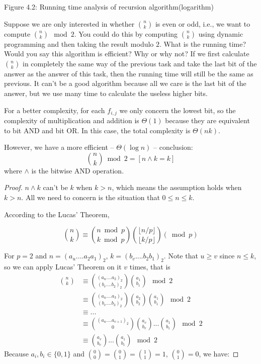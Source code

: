 \documentclass[11pt,a4paper,oneside]{article}
\begin{document}
\begin{problem}{4}
\begin{center}
	Figure 4.2: Running time analysis of recursion algorithm(logarithm)
	\end{center}
\end{problem}

\begin{problem}{5}
    \statement
    Suppose we are only interested in whether ${n \choose k}$ is even or odd,
  i.e., we want to compute ${n \choose k}  \mod 2$. You could do this by computing 
  ${n \choose k}$ using dynamic programming and then taking
  the result modulo $2$. What is the running time? Would you say this algorithm
  is efficient? Why or why not?
  \solution
If we first calculate ${n \choose k}$ in completely the same way of the previous task and take the last bit of the answer as the answer of this task, then the running time will still be the same as previous. It can't be a good algorithm because all we care is the last bit of the answer, but we use many time to calculate the useless higher bits.

For a better complexity, for each $f_{i, j}$ we only concern the lowest bit, so the complexity of multiplication and addition is $\Theta(1)$ because they are equivalent to bit AND and bit OR. In this case, the total complexity is $\Theta(nk)$.

However, we have a more efficient  -- $\Theta (\log n)$ -- conclusion: 
$$ {n \choose k} \bmod 2 = [n \wedge k = k]$$
where $\wedge$ is the bitwise AND operation.
	\begin{proof}
		$n \wedge k$ can't be $k$ when $k > n$, which means the assumption holds when $k > n$.
		All we need to concern is the situation that $0 \leq n \leq k$.

		According to the Lucas' Theorem, 
		
		\[
			{n \choose k}\equiv{{n \bmod p} \choose {k \bmod p}}{{ \lfloor n/p\rfloor} \choose { \lfloor k/p\rfloor}}(\bmod p)
		\]
		
		For $p=2$ and $n=(a_u....a_2a_1)_2$, $k=(b_v....b_2b_1)_2$. Note that $u \geq v$ since $n \leq k$, so we can apply Lucas' Theorem on it $v$ times, that is
		\begin{align*}
			{n \choose k} &\equiv {(a_u....a_2)_2 \choose (b_v....b_2)_2}{a_1 \choose b_1}\mod 2\\
			&\equiv {(a_u....a_3)_2 \choose (b_v....b_3)_2}{a_2 \choose b_2}{a_1 \choose b_1}\mod 2 \\
			&\equiv ...\\	
			&\equiv {(a_u....a_{v+1})_2 \choose 0}{a_v \choose b_v}...{a_1 \choose b_1}\mod 2\\
			&\equiv {a_v \choose b_v}...{a_1 \choose b_1}\mod 2
		\end{align*}		
		Because $a_i,b_i\in \{0,1\}$ and ${0 \choose 0}={0 \choose 1}={1 \choose 1}=1$, ${0 \choose 1}=0$, we have:
		

\end{proof}
\end{problem}
\end{document}
